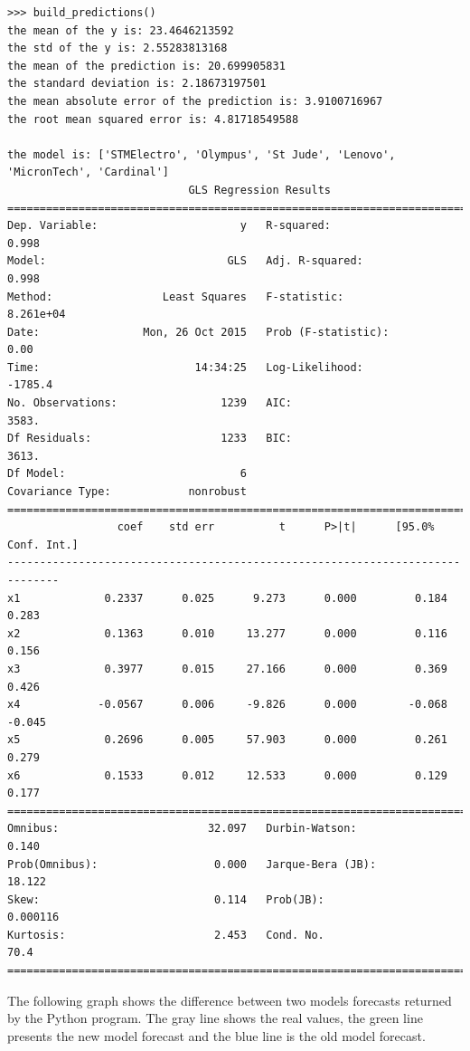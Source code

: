 \documentclass[
  twoside,
  12pt, a4paper,
  footinclude=true,
  headinclude=true,
  cleardoublepage=empty
]{article}
\begin{document}
\begin{verbatim}
>>> build_predictions()
the mean of the y is: 23.4646213592
the std of the y is: 2.55283813168
the mean of the prediction is: 20.699905831
the standard deviation is: 2.18673197501
the mean absolute error of the prediction is: 3.9100716967
the root mean squared error is: 4.81718549588

the model is: ['STMElectro', 'Olympus', 'St Jude', 'Lenovo', 'MicronTech', 'Cardinal']
                            GLS Regression Results                            
==============================================================================
Dep. Variable:                      y   R-squared:                       0.998
Model:                            GLS   Adj. R-squared:                  0.998
Method:                 Least Squares   F-statistic:                 8.261e+04
Date:                Mon, 26 Oct 2015   Prob (F-statistic):               0.00
Time:                        14:34:25   Log-Likelihood:                -1785.4
No. Observations:                1239   AIC:                             3583.
Df Residuals:                    1233   BIC:                             3613.
Df Model:                           6                                         
Covariance Type:            nonrobust                                         
==============================================================================
                 coef    std err          t      P>|t|      [95.0% Conf. Int.]
------------------------------------------------------------------------------
x1             0.2337      0.025      9.273      0.000         0.184     0.283
x2             0.1363      0.010     13.277      0.000         0.116     0.156
x3             0.3977      0.015     27.166      0.000         0.369     0.426
x4            -0.0567      0.006     -9.826      0.000        -0.068    -0.045
x5             0.2696      0.005     57.903      0.000         0.261     0.279
x6             0.1533      0.012     12.533      0.000         0.129     0.177
==============================================================================
Omnibus:                       32.097   Durbin-Watson:                   0.140
Prob(Omnibus):                  0.000   Jarque-Bera (JB):               18.122
Skew:                           0.114   Prob(JB):                     0.000116
Kurtosis:                       2.453   Cond. No.                         70.4
==============================================================================
\end{verbatim}
The following graph shows the difference between two models forecasts returned by the Python program. The gray line shows the real values, the green line presents the new model forecast and the blue line is the old model forecast.\\
\end{document}
